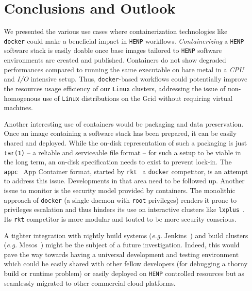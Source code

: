 \documentclass[a4paper]{jpconf}
\begin{document}
\section{Conclusions and Outlook}
We presented the various use cases where containerization technologies like
\texttt{docker} could make a beneficial impact in \texttt{HENP} workflows.
\emph{Containerizing} a \texttt{HENP} software stack is easily doable once base
images tailored to \texttt{HENP} software environments are created and published.
Containers do not show degraded performances compared to running the same
executable on bare metal in a \emph{CPU} and \emph{I/O} intensive setup.
Thus, \texttt{docker}-based workflows could potentially improve the resources
usage efficiency of our \texttt{Linux} clusters, addressing the issue of
non-homogenous use of \texttt{Linux} distributions on the Grid without requiring
virtual machines.

Another interesting use of containers would be packaging and data preservation.
Once an image containing a software stack has been prepared, it can be easily
shared and deployed.
While the on-disk representation of such a packaging is just \texttt{tar(1)} --
a reliable and serviceable file format -- for such a setup to be viable in the
long term, an on-disk specification needs to exist to prevent lock-in.
The \texttt{appc}~\cite{ref-appc} App Container format, started by
\texttt{rkt}~\cite{ref-rkt} a \texttt{docker} competitor, is an attempt to
address this issue.
Developments in that area need to be followed up.
Another issue to monitor is the security model provided by containers.
The monolithic approach of \texttt{docker} (a single daemon with \texttt{root}
privileges) renders it prone to privileges escalation and thus hinders its use
on interactive clusters like \texttt{lxplus}~\cite{ref-lxplus}.
Its \texttt{rkt} competitor is more modular and touted to be more security
conscious.

A tighter integration with nightly build systems (\emph{e.g.}
Jenkins~\cite{ref-jenkins}) and build clusters (\emph{e.g.}
Mesos~\cite{ref-mesos}) might be the subject of a future investigation.
Indeed, this would pave the way towards having a universal development and testing
environment which could be easily shared with other fellow developers (for
debugging a thorny build or runtime problem) or easily deployed on \texttt{HENP}
controlled resources but as seamlessly migrated to other commercial cloud
platforms.
\end{document}
